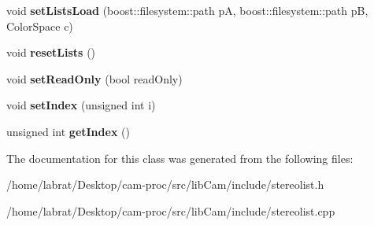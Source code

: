 \begin{DoxyCompactItemize}
\item 
void {\bfseries set\+Lists\+Load} (boost\+::filesystem\+::path pA, boost\+::filesystem\+::path pB, Color\+Space c)\hypertarget{classStereoList_ad121caa395a1d51c9231e10860695402}{}\label{classStereoList_ad121caa395a1d51c9231e10860695402}

\item 
void {\bfseries reset\+Lists} ()\hypertarget{classStereoList_acfe95960b2517588738eaec1b534294d}{}\label{classStereoList_acfe95960b2517588738eaec1b534294d}

\item 
void {\bfseries set\+Read\+Only} (bool read\+Only)\hypertarget{classStereoList_aa4f2a9a3a905d94025049f6618f69606}{}\label{classStereoList_aa4f2a9a3a905d94025049f6618f69606}

\item 
void {\bfseries set\+Index} (unsigned int i)\hypertarget{classStereoList_a615eb99260aaf6525676a44f0fde77c5}{}\label{classStereoList_a615eb99260aaf6525676a44f0fde77c5}

\item 
unsigned int {\bfseries get\+Index} ()\hypertarget{classStereoList_ab34f2642fc3625af6f4d5e43c62a62b9}{}\label{classStereoList_ab34f2642fc3625af6f4d5e43c62a62b9}

\end{DoxyCompactItemize}


The documentation for this class was generated from the following files\+:\begin{DoxyCompactItemize}
\item 
/home/labrat/\+Desktop/cam-\/proc/src/lib\+Cam/include/stereolist.\+h\item 
/home/labrat/\+Desktop/cam-\/proc/src/lib\+Cam/include/stereolist.\+cpp\end{DoxyCompactItemize}

